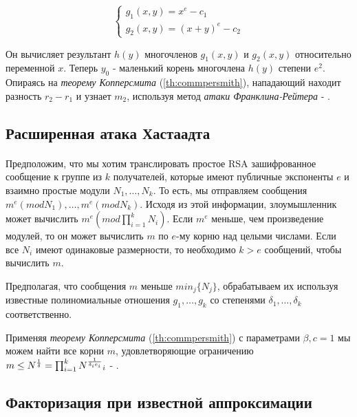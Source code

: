     \begin{equation}
	  \begin{cases}
	    g_1(x,y) = x^e - c_1 \\
	    g_2(x,y) = (x+y)^e - c_2
	  \end{cases}    
      \end{equation}
      
  Он вычисляет результант $h(y)$ многочленов $g_1(x,y)$ и $g_2(x,y)$ относительно переменной $x$. Теперь $y_0$ -
  маленький корень многочлена $h(y)$ степени $e^2$. Опираясь на \textit{теорему Копперсмита} (\ref{th:commpersmith}), нападающий находит разность $r_2 - r_1$ и 
  узнает $m_2$, используя метод \textit{атаки Франклина-Рейтера} - \cite[страницы 331-332]{may10}.

\subsection{Расширенная атака Хастаадта}

\paragraph{} Предположим, что мы хотим транслировать простое RSA зашифрованное сообщение к группе из {$k$} получателей, которые имеют публичные
  экспоненты {$e$} и взаимно простые модули {$N_1, \dots, N_k$}. То есть, мы отправляем сообщения {$m^e (mod N_1), \dots, m^e (mod N_k)$}. 
  Исходя из этой информации, злоумышленник может вычислить {$m^e (mod \prod_{i=1}^{k}{N_i})$}. Если {$m^e$} меньше, чем произведение модулей, то он 
  может вычислить {$m$} по {$e$}-му корню над целыми числами. Если все {$N_i$} имеют одинаковые размерности, то необходимо {$k > e$} сообщений,
  чтобы вычислить {$m$}.
  
  Предполагая, что сообщения {$m$} меньше {$min_j \{ N_j \}$}, обрабатываем их используя известные полиномиальные отношения {$g_1, \dots, g_k$}
  со степенями {$\delta_1, \dots, \delta_k$} соответственно.
  
  Применяя \textit{теорему Копперсмита} (\ref{th:commpersmith}) с параметрами {$\beta,c=1$} мы можем найти все корни {$m$}, удовлетворяющие ограничению
  {$m \le N^\frac{1}{\delta} = \prod_{i=1}^{k}{N\textsuperscript{{$\frac{1}{\delta_i e_i}$}}_i}$} - \cite[страницы 331-333]{may10}.

\subsection{Факторизация при известной аппроксимации}

